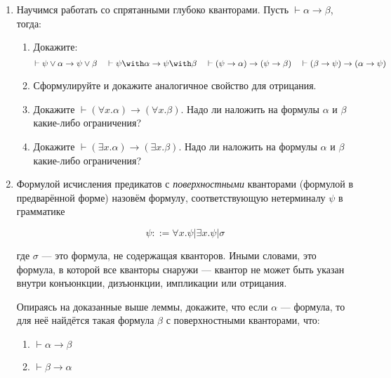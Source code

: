 \documentclass[10pt,a4paper,oneside]{article}
\begin{document}
\begin{enumerate}
\item Научимся работать со спрятанными глубоко кванторами. Пусть $\vdash\alpha\rightarrow\beta$, тогда:
\begin{enumerate}
\item Докажите: $$\vdash\psi\vee\alpha \rightarrow \psi\vee\beta\quad\vdash\psi\with\alpha \rightarrow \psi\with\beta\quad
\vdash(\psi\rightarrow\alpha) \rightarrow (\psi\rightarrow\beta)\quad\vdash(\beta\rightarrow\psi) \rightarrow (\alpha\rightarrow\psi)$$
\item Сформулируйте и докажите аналогичное свойство для отрицания.
\item Докажите $\vdash(\forall x.\alpha)\rightarrow(\forall x.\beta)$. 
Надо ли наложить на формулы $\alpha$ и $\beta$ какие-либо ограничения?
\item Докажите $\vdash(\exists x.\alpha)\rightarrow(\exists x.\beta)$. 
Надо ли наложить на формулы $\alpha$ и $\beta$ какие-либо ограничения?
\end{enumerate}

\item Формулой исчисления предикатов с \emph{поверхностными} кванторами (формулой в предварённой форме) назовём формулу,
соответствующую нетерминалу $\psi$ в грамматике

$$\psi ::= \forall x.\psi | \exists x.\psi | \sigma$$

где $\sigma$ --- это формула, не содержащая кванторов. Иными словами, это формула, в которой все кванторы снаружи ---
квантор не может быть указан внутри конъюнкции, дизъюнкции, импликации или отрицания.

Опираясь на доказанные выше леммы, докажите, что
если $\alpha$ --- формула, то для неё найдётся такая формула $\beta$ с поверхностными кванторами, что:
\begin{enumerate}
\item $\vdash\alpha\rightarrow\beta$
\item $\vdash\beta\rightarrow\alpha$
\end{enumerate}


\end{enumerate}
\end{document}
